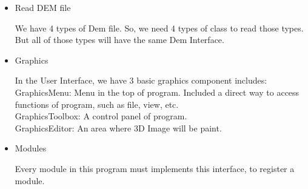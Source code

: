 \documentclass[11pt]{article}
\begin{document}
\begin{itemize}
\item Read DEM file
\par\noindent{}
We have 4 types of Dem file. So, we need 4 types of class to read those types. But all of those types will have the same Dem Interface. 

\item Graphics 
\par\noindent{}
In the User Interface, we have 3 basic graphics component includes: 
\\GraphicsMenu: Menu in the top of program. Included a direct way to access functions of program, such as file, view, etc.
\\GraphicsToolbox: A control panel of program. 
\\GraphicsEditor: An area where 3D Image will be paint.
\item Modules
\par\noindent{}
Every module in this program must implements this interface, to register a module.
\end{itemize}
\end{document}
